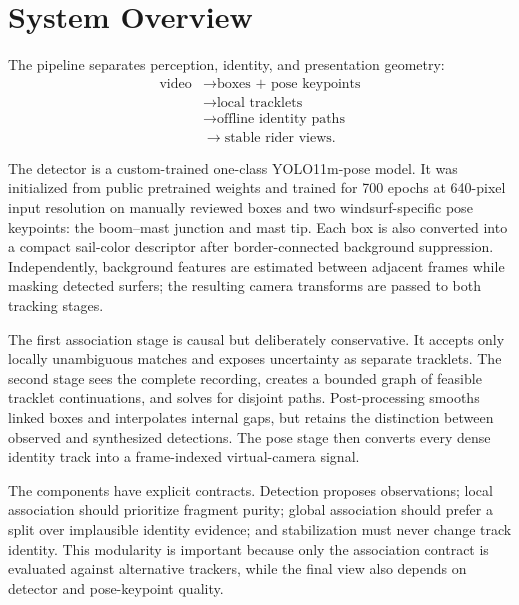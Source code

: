 \section{System Overview}
\label{sec:system}

The pipeline separates perception, identity, and presentation geometry:
\begin{equation}
\begin{aligned}
\text{video} &\rightarrow \text{boxes + pose keypoints}\\
&\rightarrow \text{local tracklets}\\
&\rightarrow \text{offline identity paths}\\
&\rightarrow \text{stable rider views}.
\end{aligned}
\label{eq:system-pipeline}
\end{equation}

The detector is a custom-trained one-class YOLO11m-pose model.  It was initialized
from public pretrained weights and trained for 700 epochs at 640-pixel input
resolution on manually reviewed boxes and two windsurf-specific pose keypoints: the
boom--mast junction and mast tip.  Each box is also converted into a compact sail-color
descriptor after border-connected background suppression.  Independently, background features
are estimated between adjacent frames while masking detected surfers; the resulting
camera transforms are passed to both tracking stages.

The first association stage is causal but deliberately conservative.  It accepts
only locally unambiguous matches and exposes uncertainty as separate tracklets.  The
second stage sees the complete recording, creates a bounded graph of feasible
tracklet continuations, and solves for disjoint paths.  Post-processing smooths linked
boxes and interpolates internal gaps, but retains the distinction between observed
and synthesized detections.  The pose stage then converts every dense identity track
into a frame-indexed virtual-camera signal.

The components have explicit contracts.  Detection proposes observations; local
association should prioritize fragment purity; global association should prefer a
split over implausible identity evidence; and stabilization must never change track
identity.  This modularity is important because only the association contract is
evaluated against alternative trackers, while the final view also depends on
detector and pose-keypoint quality.
